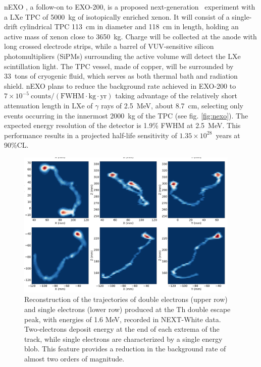 nEXO \cite{nEXO:2018ylp,nEXO:2021ujk}, a follow-on to EXO-200, is a proposed next-generation \bbonu\ experiment with a LXe TPC of 5000~kg of isotopically enriched xenon. It will consist of a single-drift cylindrical TPC 113~cm in diameter and 118~cm in length, holding an active mass of xenon close to 3650~kg. Charge will be collected at the anode with long crossed electrode strips, while a barrel of VUV-sensitive silicon photomultipliers (SiPMs) surrounding the active volume will detect the LXe scintillation light. The TPC vessel, made of copper, will be surrounded by 33~tons of cryogenic fluid, which serves as both thermal bath and radiation shield. nEXO plans to reduce the background rate achieved in EXO-200 to $7\times10^{-5}~\mathrm{counts/(FWHM\cdot kg\cdot yr)}$ taking advantage of the relatively short attenuation length in LXe of $\gamma$ rays of 2.5~MeV, about 8.7~cm, selecting only events occurring in the innermost 2000~kg of the TPC (see fig. \ref{fig:nexo}). The expected energy resolution of the detector is 1.9\% FWHM at 2.5~MeV. This performance results in a projected half-life sensitivity of $1.35\times10^{28}$~years at 90\%CL.
  
  \begin{figure}[t!b!]
\begin{center}
\includegraphics[width=0.95\textwidth]{img/nextTracks.pdf}
\end{center}
\caption{Reconstruction of the trajectories of double electrons (upper row) and single electrons (lower row) produced at  the Th double escape peak, with energies of 1.6 MeV, recorded in NEXT-White data. Two-electrons deposit energy at the end of each extrema of the track, while single electrons are characterized by a single energy blob. This feature provides a reduction in the background rate of almost two orders of magnitude.} \label{fig:next}
\end{figure}
  
